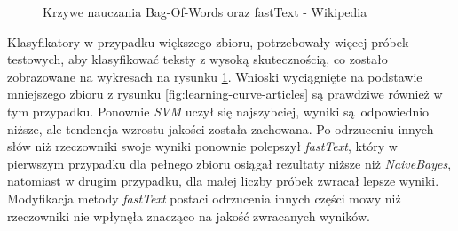 \begin{figure}[ht!]
	\centering
    \qquad
	\caption{Krzywe nauczania Bag-Of-Words oraz fastText - Wikipedia}
    \label{fig:learning-curve-wikipedia}
\end{figure}

Klasyfikatory w przypadku większego zbioru, potrzebowały więcej próbek testowych, aby klasyfikować teksty z wysoką skutecznością, co zostało zobrazowane na wykresach na rysunku \ref{fig:learning-curve-wikipedia}. Wnioski wyciągnięte na podstawie mniejszego zbioru z rysunku \ref{fig:learning-curve-articles} są prawdziwe również w tym przypadku. Ponownie \textit{SVM} uczył się najszybciej, wyniki są odpowiednio niższe, ale tendencja wzrostu jakości została zachowana. Po odrzuceniu innych słów niż rzeczowniki swoje wyniki ponownie polepszył \textit{fastText}, który w pierwszym przypadku dla pełnego zbioru osiągał rezultaty niższe niż \textit{NaiveBayes}, natomiast w drugim przypadku, dla małej liczby próbek zwracał lepsze wyniki. Modyfikacja metody \textit{fastText} postaci odrzucenia innych części mowy niż rzeczowniki nie wpłynęła znacząco na jakość zwracanych wyników. 




